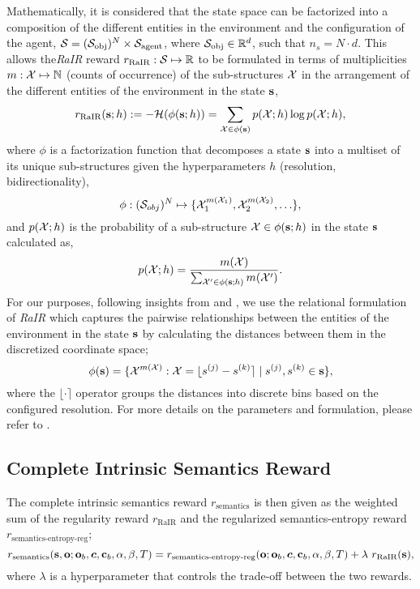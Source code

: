 Mathematically, it is considered that the state space can be factorized into a composition of the different entities in the environment and the configuration of the agent, \(\mathcal{S} = (\mathcal{S}_{\text{obj}})^N \times \mathcal{S}_{\text{agent}}\), where \(\mathcal{S}_{\text{obj}} \in \mathbb{R}^d\), such that \(n_s = N \cdot d\).
This allows the\emph {RaIR} reward \(r_{\text{RaIR}}: \mathcal{S} \mapsto \mathbb{R}\) to be formulated in terms of multiplicities \(m: \mathcal{X} \mapsto \mathbb{N}\) (counts of occurrence) of the sub-structures \(\mathcal{X}\) in the arrangement of the different entities of the environment in the state \(\mathbf{s}\),
\begin{equation}
    \label{eq:rair}
    r_{\text{RaIR}}(\mathbf{s}; h) := -\mathcal{H}(\phi(\mathbf{s}; h)) = \sum_{\mathcal{X} \in \phi(\mathbf{s})} p(\mathcal{X}; h) \log p(\mathcal{X}; h),
\end{equation}
where \(\phi\) is a factorization function that decomposes a state \(\mathbf{s}\) into a multiset of its unique sub-structures given the hyperparameters \(h\) (resolution, bidirectionality),
\begin{equation}
    \label{eq:rair-factorization}
    \phi : (\mathcal{S}_{obj})^{N} \mapsto \{ \mathcal{X}_1^{m(\mathcal{X}_1)}, \mathcal{X}_2^{m(\mathcal{X}_2)}, \ldots \},
\end{equation}
and \(p(\mathcal{X}; h)\) is the probability of a sub-structure \(\mathcal{X} \in \phi(\mathbf{s}; h)\) in the state \(\mathbf{s}\) calculated as,
\begin{equation}
    \label{eq:rair-probability}
    p(\mathcal{X}; h) = \dfrac{m(\mathcal{X})}{\sum_{\mathcal{X}' \in \phi(\mathbf{s}; h)} m(\mathcal{X}')}.
\end{equation}
% 
For our purposes, following insights from \cite{symmetry} and \cite{compositional}, we use the relational formulation of \emph{RaIR} which captures the pairwise relationships between the entities of the environment in the state \(\mathbf{s}\) by calculating the distances between them in the discretized coordinate space;
\begin{equation}
    \label{eq:rair-relational}
    \phi(\mathbf{s}) = \{ \mathcal{X}^{m(\mathcal{X})} : \mathcal{X} = \lfloor s^{(j)} - s^{(k)} \rceil \mid s^{(j)}, s^{(k)} \in \mathbf{s} \},
\end{equation}
where the \(\lfloor \cdot \rceil\) operator groups the distances into discrete bins based on the configured resolution.
For more details on the parameters and formulation, please refer to .

\subsection{Complete Intrinsic Semantics Reward}
\label{sec:complete-semantics-reward}
The complete intrinsic semantics reward \(r_{\text{semantics}}\) is then given as the weighted sum of the regularity reward \(r_{\text{RaIR}}\) and the regularized semantics-entropy reward \(r_{\text{semantics-entropy-reg}}\);
\begin{equation}
    \label{eq:semantics-reward}
    r_{\text{semantics}}(\mathbf{s}, \mathbf{o}; \mathbf{o}_b, \bm{c}, \mathbf{c}_b, \alpha, \beta, T) =r_{\text{semantics-entropy-reg}}(\mathbf{o}; \mathbf{o}_b, \bm{c}, \mathbf{c}_b, \alpha, \beta, T) + \lambda\ r_{\text{RaIR}}(\mathbf{s}),
\end{equation}
where \(\lambda\) is a hyperparameter that controls the trade-off between the two rewards.


